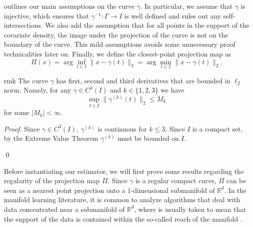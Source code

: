 \documentclass[11pt]{article}
\begin{document}
 outlines our main assumptions on the curve $\gamma$. In particular, we assume that $\gamma$ is injective, which ensures that $\gamma^{-1}:\Gamma\rightarrow I$ is well defined and rules out any self-intersections. We also add the assumption that for all points in the support of the covariate density, the image under the projection of the curve is not on the boundary of the curve. This mild assumptions avoids some unnecessary proof technicalities later on. Finally, we define the closest-point projection map as
\begin{equation}\label{def: projection}
\Pi(x) = \arg\inf_{t\in I}\|x - \gamma(t)\|_2 = \arg\min_{t\in I}\|x - \gamma(t)\|_2.
\end{equation}



\begin{restatable}{rmk}{} \label{remark: deriv bound}
    The curve $\gamma$ has first, second and third derivatives that are bounded in $\ell_2$ norm. Namely, for any $\gamma \in C^3(I)$ and $k \in \{1,2,3\}$ we have 
    \[\sup_{t\in I}\|\gamma^{(k)}(t)\|_2 \leq M_k\]
    for some $|M_k| < \infty$.
\end{restatable}
\noindent \textit{Proof.} Since $\gamma \in C^3(I)$, $\gamma^{(k)}$ is continuous for $k \leq 3$. Since $I$ is a compact set, by the Extreme Value Theorem $\gamma^{(k)}$ must be bounded on $I$. 

\qed{}



Before instantiating our estimator, we will first prove some results regarding the regularity of the projection map $\Pi$. Since $\gamma$ is a regular compact curve, $\Pi$ can be seen as a nearest point projection onto a $1$-dimensional submanifold of $\mathbb{R}^d$. In the manifold learning literature, it is common to analyze algorithms that deal with data concentrated near a submanifold of $\mathbb{R}^d$, where  is usually taken to mean that the support of the data is contained within the so-called reach of the manifold \cite{genovese2012minimax, balakrishnan2012minimax, kokotnoisy, saidi2024recovering}.
\end{document}
